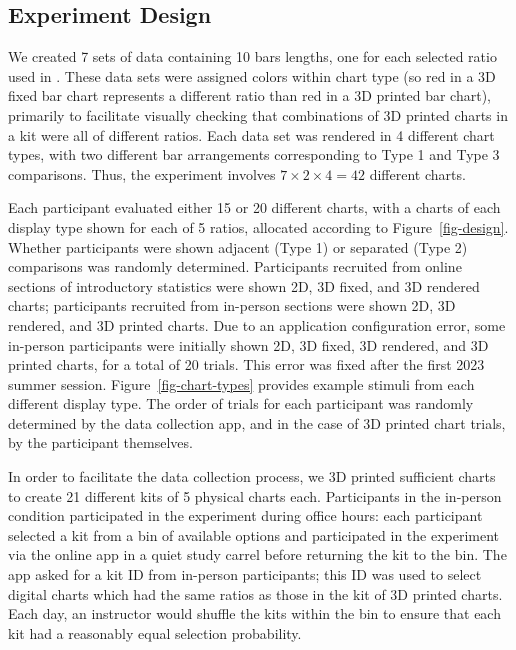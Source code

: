 \documentclass[runningheads
]{llncs}
\begin{document}
\subsection{Experiment Design}\label{experiment-design}

We created 7 sets of data containing 10 bars lengths, one for each
selected ratio used in
\textcite{clevelandGraphicalPerceptionTheory1984}. These data sets were
assigned colors within chart type (so red in a 3D fixed bar chart
represents a different ratio than red in a 3D printed bar chart),
primarily to facilitate visually checking that combinations of 3D
printed charts in a kit were all of different ratios. Each data set was
rendered in 4 different chart types, with two different bar arrangements
corresponding to Type 1 and Type 3 comparisons. Thus, the experiment
involves \(7 \times 2 \times 4 = 42\) different charts.

Each participant evaluated either 15 or 20 different charts, with a
charts of each display type shown for each of 5 ratios, allocated
according to Figure~\ref{fig-design}. Whether participants were shown
adjacent (Type 1) or separated (Type 2) comparisons was randomly
determined. Participants recruited from online sections of introductory
statistics were shown 2D, 3D fixed, and 3D rendered charts; participants
recruited from in-person sections were shown 2D, 3D rendered, and 3D
printed charts. Due to an application configuration error, some
in-person participants were initially shown 2D, 3D fixed, 3D rendered,
and 3D printed charts, for a total of 20 trials. This error was fixed
after the first 2023 summer session. Figure~\ref{fig-chart-types}
provides example stimuli from each different display type. The order of
trials for each participant was randomly determined by the data
collection app, and in the case of 3D printed chart trials, by the
participant themselves.

In order to facilitate the data collection process, we 3D printed
sufficient charts to create 21 different kits of 5 physical charts each.
Participants in the in-person condition participated in the experiment
during office hours: each participant selected a kit from a bin of
available options and participated in the experiment via the online app
in a quiet study carrel before returning the kit to the bin. The app
asked for a kit ID from in-person participants; this ID was used to
select digital charts which had the same ratios as those in the kit of
3D printed charts. Each day, an instructor would shuffle the kits within
the bin to ensure that each kit had a reasonably equal selection
probability.
\end{document}
